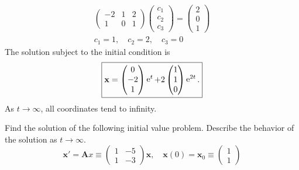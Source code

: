 \begin{Example}
\begin{gather*}
\begin{pmatrix}
      -2 & 1 & 2 \\
      1 & 0 & 1
    \end{pmatrix}
    \begin{pmatrix}
      c_1 \\
      c_2 \\
      c_3
    \end{pmatrix}
    =
    \begin{pmatrix}
      2 \\
      0 \\
      1
    \end{pmatrix} \\
    c_1 = 1, \quad c_2 = 2, \quad c_3 = 0
  \end{gather*}
  The solution subject to the initial condition is
  \[
  \boxed{
    \mathbf{x} = 
    \begin{pmatrix} 0 \\ -2 \\ 1 \end{pmatrix} \mathop{\mathrm{e}}\nolimits^t
    + 2 \begin{pmatrix} 1 \\ 1 \\ 0 \end{pmatrix} \mathop{\mathrm{e}}\nolimits^{2 t}.
    }
  \]
  As $t \to \infty$, all coordinates tend to infinity.
\end{Example}







\begin{Exercise}
  \label{exercise x'=(1-51-3)x t-infinity}
  Find the solution of the following initial value problem.
  Describe the behavior of the solution as $t \to \infty$.
  \[
  \mathbf{x}' = \mathbf{A} x \equiv
  \begin{pmatrix}
    1 & -5 \\
    1 & -3
  \end{pmatrix} 
  \mathbf{x}, \quad 
  \mathbf{x}(0) = \mathbf{x}_0 \equiv
  \begin{pmatrix}
    1 \\
    1
  \end{pmatrix}
  \]

\end{Exercise}





